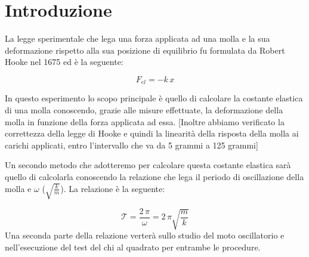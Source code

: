 \section{Introduzione}
La legge sperimentale che lega una forza applicata ad una molla e la sua deformazione rispetto alla sua posizione di equilibrio fu formulata da Robert Hooke nel 1675 ed è la seguente:

\begin{equation}
	F_{el} = -k\,x
	\label{hooke}
\end{equation}

In questo esperimento lo scopo principale è quello di calcolare la costante elastica di una molla conoscendo, grazie alle misure effettuate, la deformazione della molla in funzione della forza applicata ad essa. [Inoltre abbiamo verificato la correttezza della legge di Hooke e quindi la linearità della risposta della molla ai carichi applicati, entro l'intervallo che va da 5 grammi a 125 grammi]

Un secondo metodo che adotteremo per calcolare questa costante elastica sarà quello di calcolarla conoscendo la relazione che lega il periodo di oscillazione della molla e $\omega$ ($\sqrt{\frac{k}{m}}$). La relazione è la seguente:

\begin{equation}
	\mathcal{T} = \frac{2\,\pi}{\omega} = {2\,\pi}{\sqrt{\frac{m}{k}}}
\end{equation}
%
Una seconda parte della relazione verterà sullo studio del moto oscillatorio e nell'esecuzione del test del chi al quadrato per entrambe le procedure.

